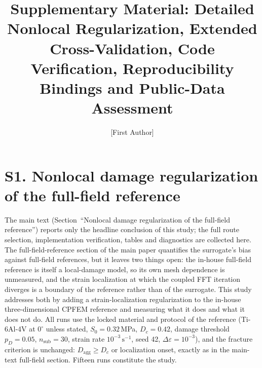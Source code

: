 \documentclass[12pt,a4paper,twocolumn]{article}
\title{\textbf{Supplementary Material: Detailed Nonlocal Regularization, Extended Cross-Validation, Code Verification, Reproducibility Bindings and Public-Data Assessment}}
\author{[First Author] \thinspace [Second Author]}
\date{}
\providecommand{\ang}[1]{\ensuremath{#1^{\circ}}}
\begin{document}
\maketitle

\section*{S1. Nonlocal damage regularization of the full-field reference}

The main text (Section~``Nonlocal damage regularization of the full-field reference'') reports only the
headline conclusion of this study; the full route selection, implementation verification, tables and
diagnostics are collected here. The full-field-reference section of the main paper quantifies the surrogate's
bias against full-field references, but it leaves two things open: the in-house full-field reference is
itself a local-damage model, so its own mesh dependence is unmeasured, and the strain localization at which
the coupled FFT iteration diverges is a boundary of the reference rather than of the surrogate. This study
addresses both by adding a strain-localization regularization to the in-house three-dimensional CPFEM
reference and measuring what it does and what it does not do. All runs use the locked material and protocol
of the reference (Ti-6Al-4V at $\ang{0}$ unless stated, $S_0 = 0.32$\,MPa, $D_c = 0.42$, damage threshold
$p_D = 0.05$, $n_{\mathrm{sub}} = 30$, strain rate $10^{-3}\,\mathrm{s}^{-1}$, seed 42,
$\Delta\varepsilon = 10^{-3}$), and the fracture criterion is unchanged: $D_{\mathrm{agg}} \ge D_c$ or
localization onset, exactly as in the main-text full-field section. Fifteen runs constitute the study.
\end{document}
